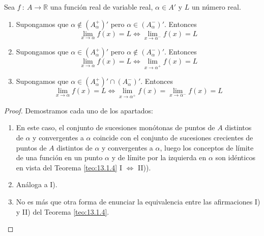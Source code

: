 \begin{prop}
    Sea $f ~:~ A \longrightarrow \mathbb{R}$ una función real de variable real, $\alpha \in A'$ y $L$ un número real.
    \begin{enumerate}
        \item Supongamos que $\alpha \notin (A_{\alpha}^{+})'$ pero $\alpha \in (A_{\alpha}^{-})'$. Entonces
        \begin{equation*}
           \lim_{x \to \alpha} f(x) = L \Longleftrightarrow \lim_{x \to \alpha^{-}} f(x) = L
        \end{equation*}

        \item Supongamos que $\alpha \in (A_{\alpha}^{+})'$ pero $\alpha \notin (A_{\alpha}^{-})'$. Entonces
        \begin{equation*}
           \lim_{x \to \alpha} f(x) = L \Longleftrightarrow \lim_{x \to \alpha^{+}} f(x) = L
        \end{equation*}

        \item Supongamos que $\alpha \in (A_{\alpha}^{+})' \cap (A_{\alpha}^{-})'$. Entonces
        \begin{equation*}
            \lim_{x \to \alpha} f(x) = L \Longleftrightarrow \lim_{x \to \alpha^{+}} f(x) = \lim_{x \to \alpha^{-}} f(x) = L
        \end{equation*}
    \end{enumerate}
\end{prop}
\begin{proof}
    Demostramos cada uno de los apartados:
    \begin{enumerate}
        \item En este caso, el conjunto de sucesiones monótonas de puntos de $A$ distintos de $\alpha$ y convergentes a $\alpha$ coincide con el conjunto de sucesiones crecientes de puntos de $A$ distintos de $\alpha$ y convergentes a $\alpha$, luego los conceptos de límite de una función en un punto $\alpha$ y de límite por la izquierda en $\alpha$ son idénticos
        en vista del Teorema \ref{teo:13.1.4} I $\Longleftrightarrow$ II)).

        \item Análoga a I).

        \item No es más que otra forma de enunciar la equivalencia entre las afirmaciones I) y II) del Teorema \ref{teo:13.1.4}.
    \end{enumerate}
\end{proof}

